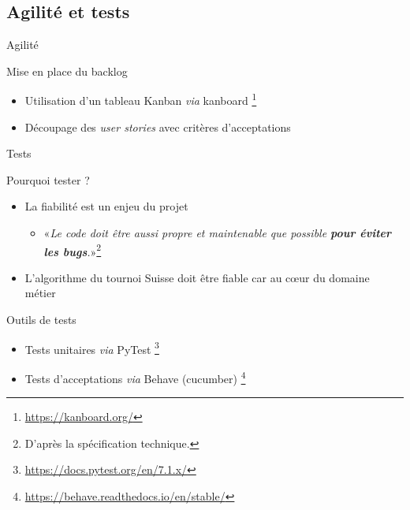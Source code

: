 \subsection{Agilité et tests}
\begin{frame}{Agilité}
  \begin{block}{Mise en place du backlog}
    \begin{itemize}
    \item Utilisation d'un tableau Kanban \textit{via} kanboard \footnote{\url{https://kanboard.org/}}
    \item Découpage des \textit{user stories} avec critères d'acceptations
    \end{itemize}
  \end{block}
\end{frame}

\begin{frame}{Tests}
  \begin{block}{Pourquoi tester ?}
    \begin{itemize}   
    \item La fiabilité est un enjeu du projet
      \begin{itemize}
      \item «\textit{Le code doit être aussi propre et maintenable que
        possible \textbf{pour éviter les bugs}.}»\footnote{D'après la
      spécification technique.}
      \end{itemize}
    \item L'algorithme du tournoi Suisse doit être fiable car au cœur
      du domaine métier
    \end{itemize}
  \end{block}
  
  \begin{block}{Outils de tests}
    \begin{itemize}
    \item Tests unitaires \textit{via} PyTest \footnote{\url{https://docs.pytest.org/en/7.1.x/}}
    \item Tests d'acceptations \textit{via} Behave
      (cucumber) \footnote{\url{https://behave.readthedocs.io/en/stable/}}
    \end{itemize}    
  \end{block}
\end{frame}

